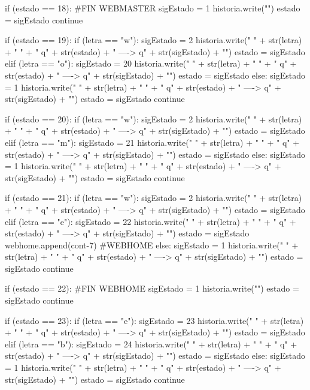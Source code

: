 \documentclass{article}
\begin{document}
\begin{python}
				if (estado == 18): #FIN WEBMASTER
					sigEstado = 1
					historia.write("\n")
					estado = sigEstado
				continue
			
				if (estado == 19):
					if (letra == "w"):
						sigEstado = 2    
						historia.write(" { " + str(letra) + " } " + "  q" + str(estado) + "  ---->  q" + str(sigEstado) + "\n")
						estado = sigEstado
					elif (letra == "o"):
						sigEstado = 20
						historia.write(" { " + str(letra) + " } " + "  q" + str(estado) + "  ---->  q" + str(sigEstado) + "\n")
						estado = sigEstado            
					else:
						sigEstado = 1
						historia.write(" { " + str(letra) + " } " + "  q" + str(estado) + "  ---->  q" + str(sigEstado) + "\n")
						estado = sigEstado
					continue
			
				if (estado == 20):
					if (letra == "w"):
						sigEstado = 2 
						historia.write(" { " + str(letra) + " } " + "  q" + str(estado) + "  ---->  q" + str(sigEstado) + "\n")
						estado = sigEstado       
					elif (letra == "m"):
						sigEstado = 21
						historia.write(" { " + str(letra) + " } " + "  q" + str(estado) + "  ---->  q" + str(sigEstado) + "\n")
						estado = sigEstado            
					else:
						sigEstado = 1
						historia.write(" { " + str(letra) + " } " + "  q" + str(estado) + "  ---->  q" + str(sigEstado) + "\n")
						estado = sigEstado
					continue
			
				if (estado == 21):
					if (letra == "w"):
						sigEstado = 2       
						historia.write(" { " + str(letra) + " } " + "  q" + str(estado) + "  ---->  q" + str(sigEstado) + "\n")
						estado = sigEstado    
					elif (letra == "e"):
						sigEstado = 22
						historia.write(" { " + str(letra) + " } " + "  q" + str(estado) + "  ---->  q" + str(sigEstado) + "\n")
						estado = sigEstado
						webhome.append(cont-7) #WEBHOME            
					else:
						sigEstado = 1
						historia.write(" { " + str(letra) + " } " + "  q" + str(estado) + "  ---->  q" + str(sigEstado) + "\n")
						estado = sigEstado
					continue
			
				if (estado == 22): #FIN WEBHOME
					sigEstado = 1  
					historia.write("\n")
					estado = sigEstado
				continue
			
				if (estado == 23):             
					if (letra == "e"):
						sigEstado = 23
						historia.write(" { " + str(letra) + " } " + "  q" + str(estado) + "  ---->  q" + str(sigEstado) + "\n")
						estado = sigEstado
					elif (letra == "b"):
						sigEstado = 24    
						historia.write(" { " + str(letra) + " } " + "  q" + str(estado) + "  ---->  q" + str(sigEstado) + "\n")
						estado = sigEstado             
					else:
						sigEstado = 1
						historia.write(" { " + str(letra) + " } " + "  q" + str(estado) + "  ---->  q" + str(sigEstado) + "\n")
						estado = sigEstado
					continue
			

\end{python}
\end{document}
